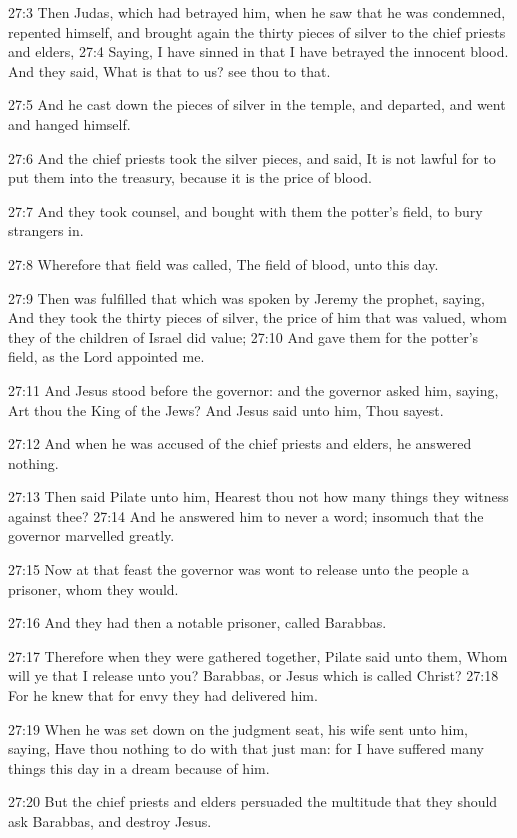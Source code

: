 27:3 Then Judas, which had betrayed him, when he saw that he was
condemned, repented himself, and brought again the thirty pieces of
silver to the chief priests and elders, 27:4 Saying, I have sinned in
that I have betrayed the innocent blood. And they said, What is that
to us? see thou to that.

27:5 And he cast down the pieces of silver in the temple, and
departed, and went and hanged himself.

27:6 And the chief priests took the silver pieces, and said, It is not
lawful for to put them into the treasury, because it is the price of
blood.

27:7 And they took counsel, and bought with them the potter's field,
to bury strangers in.

27:8 Wherefore that field was called, The field of blood, unto this
day.

27:9 Then was fulfilled that which was spoken by Jeremy the prophet,
saying, And they took the thirty pieces of silver, the price of him
that was valued, whom they of the children of Israel did value; 27:10
And gave them for the potter's field, as the Lord appointed me.

27:11 And Jesus stood before the governor: and the governor asked him,
saying, Art thou the King of the Jews? And Jesus said unto him, Thou
sayest.

27:12 And when he was accused of the chief priests and elders, he
answered nothing.

27:13 Then said Pilate unto him, Hearest thou not how many things they
witness against thee?  27:14 And he answered him to never a word;
insomuch that the governor marvelled greatly.

27:15 Now at that feast the governor was wont to release unto the
people a prisoner, whom they would.

27:16 And they had then a notable prisoner, called Barabbas.

27:17 Therefore when they were gathered together, Pilate said unto
them, Whom will ye that I release unto you? Barabbas, or Jesus which
is called Christ?  27:18 For he knew that for envy they had delivered
him.

27:19 When he was set down on the judgment seat, his wife sent unto
him, saying, Have thou nothing to do with that just man: for I have
suffered many things this day in a dream because of him.

27:20 But the chief priests and elders persuaded the multitude that
they should ask Barabbas, and destroy Jesus.

